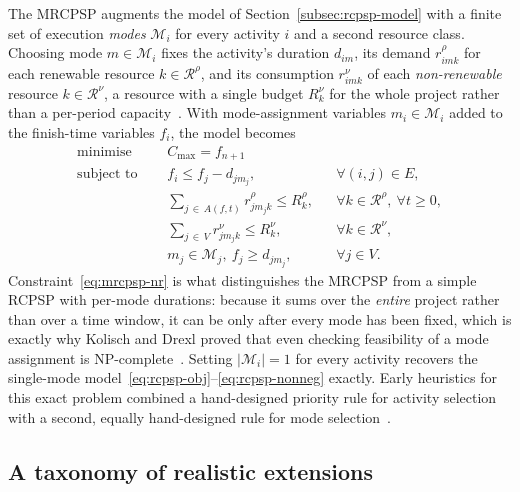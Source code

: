 The MRCPSP augments the model of
Section~\ref{subsec:rcpsp-model} with a finite set of execution \emph{modes}
$\mathcal{M}_i$ for every activity $i$ and a second resource class. Choosing mode
$m \in \mathcal{M}_i$ fixes the activity's duration $d_{im}$, its demand $r^{\rho}_{imk}$ for each
renewable resource $k \in \mathcal{R}^{\rho}$, and its consumption $r^{\nu}_{imk}$ of each
\emph{non-renewable} resource $k \in \mathcal{R}^{\nu}$, a resource with a single budget
$R^{\nu}_k$ for the whole project rather than a per-period
capacity~\cite{kolischdrexl1994,hartmann2010survey}. With mode-assignment
variables $m_i \in \mathcal{M}_i$ added to the finish-time variables $f_i$, the model
becomes
\begin{align}
  \text{minimise } \quad & C_{\max} = f_{n+1} \label{eq:mrcpsp-obj}\\
  \text{subject to } \quad
  & f_i \le f_j - d_{j m_j}, && \forall (i,j) \in E, \label{eq:mrcpsp-prec}\\
  & \sum_{j \,\in\, A(f,t)} r^{\rho}_{j m_j k} \le R^{\rho}_k, && \forall k \in \mathcal{R}^{\rho},\ \forall t \ge 0, \label{eq:mrcpsp-res}\\
  & \sum_{j \,\in\, V} r^{\nu}_{j m_j k} \le R^{\nu}_k, && \forall k \in \mathcal{R}^{\nu}, \label{eq:mrcpsp-nr}\\
  & m_j \in \mathcal{M}_j,\ f_j \ge d_{j m_j}, && \forall j \in V. \label{eq:mrcpsp-mode}
\end{align}
Constraint~\eqref{eq:mrcpsp-nr} is what distinguishes the MRCPSP from a simple
RCPSP with per-mode durations: because it sums over the \emph{entire} project
rather than over a time window, it can be  only after every mode has
been fixed, which is exactly why Kolisch and Drexl proved that even checking
feasibility of a mode assignment is NP-complete~\cite{kolischdrexl1994}.
Setting $|\mathcal{M}_i|=1$ for every activity recovers the single-mode
model~\eqref{eq:rcpsp-obj}--\eqref{eq:rcpsp-nonneg} exactly.
Early heuristics for this exact problem combined a hand-designed priority rule
for activity selection with a second, equally hand-designed rule for mode
selection~\cite{boctor1996new,kolisch1994priority,lova2006mrcpsp}.

\subsection{A taxonomy of realistic extensions}
\label{subsec:taxonomy}


